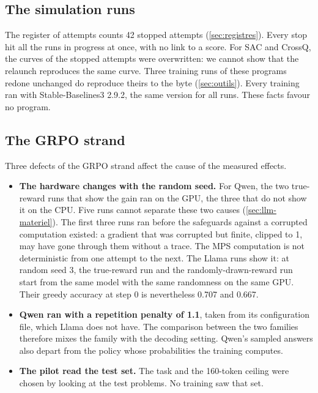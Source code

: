 \subsection{The simulation runs}

The register of attempts counts 42 stopped attempts (\cref{sec:registres}). Every stop hit all the
runs in progress at once, with no link to a score. For SAC and CrossQ, the curves of the stopped
attempts were overwritten: we cannot show that the relaunch reproduces the same
curve. Three training runs of these programs redone unchanged do reproduce theirs to the byte
(\cref{sec:outils}). Every training ran with
Stable-Baselines3 2.9.2, the same version for all runs. These facts favour no program.

\subsection{The GRPO strand}

Three defects of the GRPO strand affect the cause of the measured effects.
\begin{itemize}
  \item \textbf{The hardware changes with the random seed.} For Qwen, the two true-reward runs that
        show the gain ran on the GPU, the three that do not show it on the CPU. Five runs cannot
        separate these two causes (\cref{sec:llm-materiel}). The first three runs ran before the
        safeguards against a corrupted computation existed: a gradient that was corrupted but
        finite, clipped to 1, may have gone through them without a trace. The MPS computation is not
        deterministic from one attempt to the next. The Llama runs show it: at random seed 3, the
        true-reward run and the randomly-drawn-reward run start from the same model with the same
        randomness on the same GPU. Their greedy accuracy at step 0 is nevertheless 0.707 and 0.667.
  \item \textbf{Qwen ran with a repetition penalty of 1.1}, taken from its configuration file, which
        Llama does not have. The comparison between the two families therefore mixes the family with
        the decoding setting. Qwen's sampled answers also depart from the policy whose probabilities
        the training computes.
  \item \textbf{The pilot read the test set.} The task and the 160-token ceiling were chosen by
        looking at the test problems. No training saw that set.
\end{itemize}


